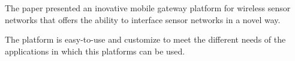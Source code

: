 The paper presented an inovative mobile gateway platform for wireless sensor networks
that offers the ability to interface sensor networks in a novel way.



The platform is easy-to-use and customize to meet the different needs of the applications in which this platforms can be used.


